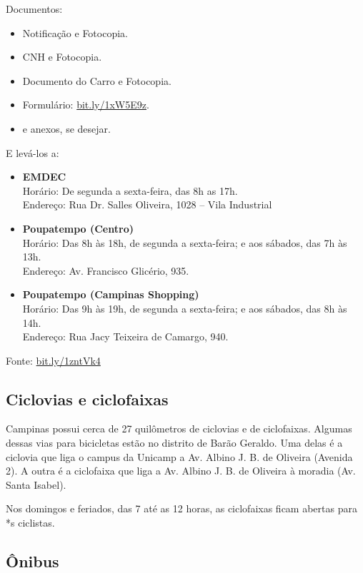 Documentos:
\begin{itemize}
    \item Notificação e Fotocopia.
    \item CNH e Fotocopia.
    \item Documento do Carro e Fotocopia.
    \item Formulário:
      \url{bit.ly/1xW5E9z}.
    \item e anexos, se desejar.
\end{itemize}

E levá-los a:
\begin{itemize}
    \item \textbf{EMDEC}
        \\Horário: De segunda a sexta-feira, das 8h as 17h.
        \\Endereço: Rua Dr. Salles Oliveira, 1028 -- Vila Industrial

    \item \textbf{Poupatempo (Centro)}
        \\Horário: Das 8h às 18h, de segunda a sexta-feira;
                    e aos sábados, das 7h às 13h.
        \\Endereço: Av. Francisco Glicério, 935.

    \item \textbf{Poupatempo (Campinas Shopping)}
        \\Horário: Das 9h às 19h, de segunda a sexta-feira;
                    e aos sábados, das 8h às 14h.
        \\Endereço: Rua Jacy Teixeira de Camargo, 940.
\end{itemize}

Fonte:
\url{bit.ly/1zntVk4}

\subsection{Ciclovias e ciclofaixas}

Campinas possui cerca de 27 quilômetros de ciclovias e de ciclofaixas. Algumas
dessas vias para bicicletas estão no distrito de Barão Geraldo. Uma delas é a
ciclovia que liga o campus da Unicamp a Av. Albino J. B. de Oliveira (Avenida
2). A outra é a ciclofaixa que liga a Av. Albino J. B. de Oliveira à moradia
(Av. Santa Isabel).

Nos domingos e feriados, das 7 até as 12 horas, as ciclofaixas ficam abertas
para *s ciclistas.

\subsection{Ônibus}

